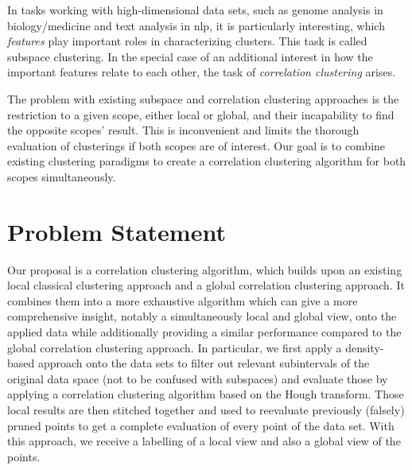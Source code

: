 In tasks working with high-dimensional data sets, such as genome analysis in biology/medicine and text analysis in \gls{nlp}, it is particularly interesting, which \textit{features} play important roles in characterizing clusters. This task is called subspace clustering. In the special case of an additional interest in how the important features relate to each other, the task of \textit{correlation clustering} arises.

The problem with existing subspace and correlation clustering approaches is the restriction to a given scope, either local or global, and their incapability to find the opposite scopes' result. This is inconvenient and limits the thorough evaluation of clusterings if both scopes are of interest. Our goal is to combine existing clustering paradigms to create a correlation clustering algorithm for both scopes simultaneously.





\section{Problem Statement}
Our proposal is a correlation clustering algorithm, which builds upon an existing local classical clustering approach and a global correlation clustering approach. It combines them into a more exhaustive algorithm which can give a more comprehensive insight, notably a simultaneously local and global view, onto the applied data while additionally providing a similar performance compared to the global correlation clustering approach. In particular, we first apply a density-based approach onto the data sets to filter out relevant subintervals of the original data space (not to be confused with subspaces) and evaluate those by applying a correlation clustering algorithm based on the Hough transform. Those local results are then stitched together and used to reevaluate previously (falsely) pruned points to get a complete evaluation of every point of the data set. With this approach, we receive a labelling of a local view and also a global view of the points. 

